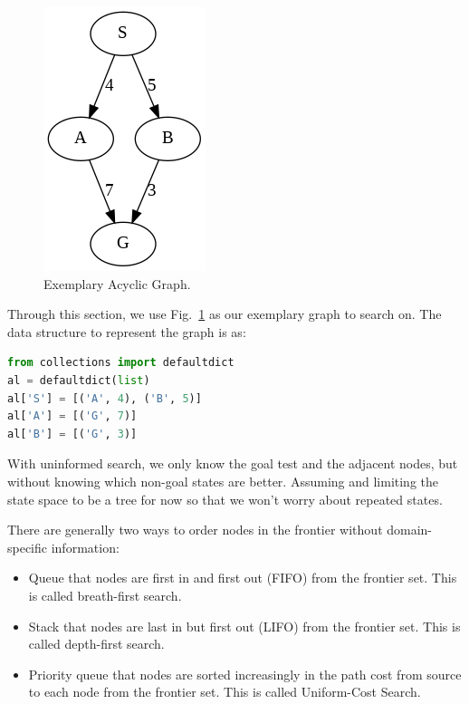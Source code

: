 \documentclass[../main.tex]{subfiles}
\begin{document}
\begin{figure}[!ht]
    \centering
    \includegraphics[width=0.3\columnwidth]{fig/ucs.png}
        \caption{Exemplary Acyclic Graph. }
    \label{fig:ucs}
\end{figure}
Through this section, we use Fig.~\ref{fig:ucs} as our exemplary graph to search on. The data structure to represent the graph is as:
\begin{lstlisting}[language=Python]
from collections import defaultdict
al = defaultdict(list)
al['S'] = [('A', 4), ('B', 5)]
al['A'] = [('G', 7)]
al['B'] = [('G', 3)]
\end{lstlisting}

With uninformed search, we only know the goal test and the adjacent nodes, but without knowing which non-goal states are better. Assuming and limiting the state space to be a tree for now so that we won't worry about repeated states. 

There are generally two ways to order nodes in the frontier without domain-specific information:
\begin{itemize}
    \item Queue that nodes are first in and first out (FIFO) from the frontier set. This is called breath-first search.
    \item Stack that nodes are last in but first out (LIFO) from the frontier set. This is called depth-first search. 
    \item Priority queue that nodes are sorted increasingly in the path cost from source to each node from the frontier set. This is called Uniform-Cost Search.
\end{itemize}
\end{document}
